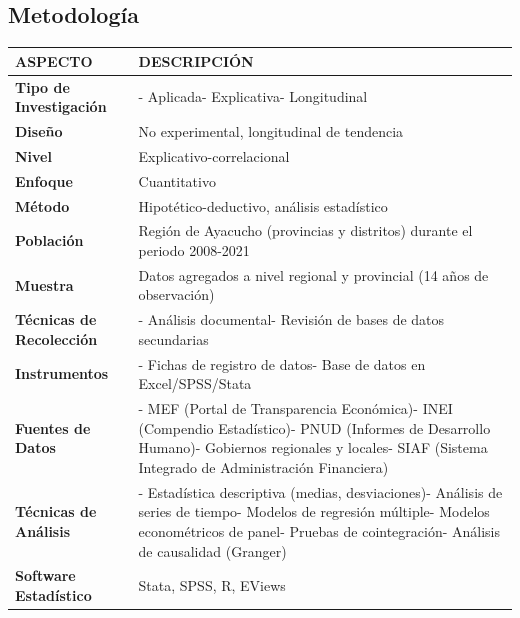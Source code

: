 \documentclass[
  man,
  floatsintext,
  longtable,
  a4paper,
  nolmodern,
  notxfonts,
  notimes,
  12pt,
  colorlinks=true,linkcolor=blue,citecolor=blue,urlcolor=blue]{apa7}
\newcounter{none} %
\begin{document}
\subsection{Metodología}\label{metodologuxeda}

{\def\LTcaptype{none} %
\begin{longtable}[]{@{}
  >{\raggedright\arraybackslash}p{}
  >{\raggedright\arraybackslash}p{}@{}}
\toprule\noalign{}
\begin{minipage}[b]{\linewidth}\raggedright
ASPECTO
\end{minipage} & \begin{minipage}[b]{\linewidth}\raggedright
DESCRIPCIÓN
\end{minipage} \\
\midrule\noalign{}
\endhead
\bottomrule\noalign{}
\endlastfoot
\textbf{Tipo de Investigación} & - Aplicada- Explicativa-
Longitudinal \\
\textbf{Diseño} & No experimental, longitudinal de tendencia \\
\textbf{Nivel} & Explicativo-correlacional \\
\textbf{Enfoque} & Cuantitativo \\
\textbf{Método} & Hipotético-deductivo, análisis estadístico \\
\textbf{Población} & Región de Ayacucho (provincias y distritos) durante
el periodo 2008-2021 \\
\textbf{Muestra} & Datos agregados a nivel regional y provincial (14
años de observación) \\
\textbf{Técnicas de Recolección} & - Análisis documental- Revisión de
bases de datos secundarias \\
\textbf{Instrumentos} & - Fichas de registro de datos- Base de datos en
Excel/SPSS/Stata \\
\textbf{Fuentes de Datos} & - MEF (Portal de Transparencia Económica)-
INEI (Compendio Estadístico)- PNUD (Informes de Desarrollo Humano)-
Gobiernos regionales y locales- SIAF (Sistema Integrado de
Administración Financiera) \\
\textbf{Técnicas de Análisis} & - Estadística descriptiva (medias,
desviaciones)- Análisis de series de tiempo- Modelos de regresión
múltiple- Modelos econométricos de panel- Pruebas de cointegración-
Análisis de causalidad (Granger) \\
\textbf{Software Estadístico} & Stata, SPSS, R, EViews \\
\end{longtable}
}
\end{document}
